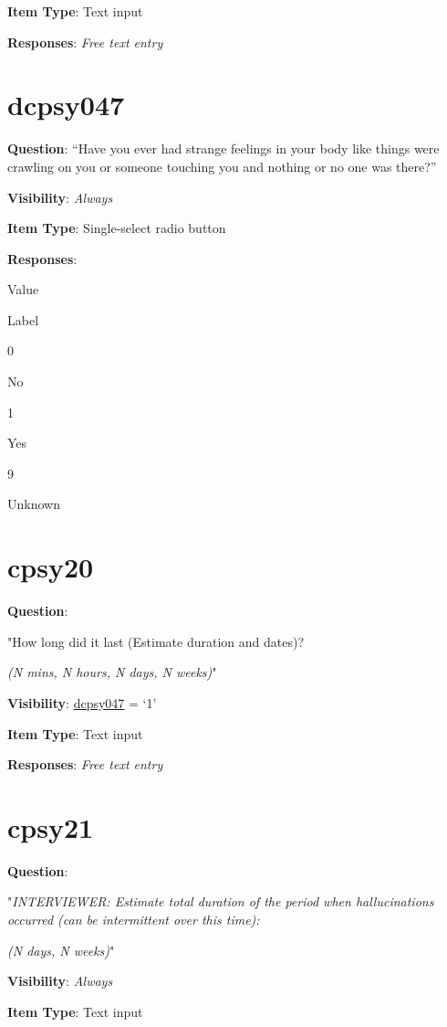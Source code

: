 \documentclass[]{book}
\begin{document}
\textbf{Item Type}: Text input

\textbf{Responses}: \emph{Free text entry}

\hypertarget{dcpsy047}{%
\section{dcpsy047}\label{dcpsy047}}

\textbf{Question}: ``Have you ever had strange feelings in your body like things were crawling on you or someone touching you and nothing or no one was there?''

\textbf{Visibility}: \emph{Always}

\textbf{Item Type}: Single-select radio button

\textbf{Responses}:

Value

Label

0

No

1

Yes

9

Unknown

\hypertarget{cpsy20}{%
\section{cpsy20}\label{cpsy20}}

\textbf{Question}:

"How long did it last (Estimate duration and dates)?

\emph{(N mins, N hours, N days, N weeks)}"

\textbf{Visibility}: \protect\hyperlink{dcpsy047}{dcpsy047} = `1'

\textbf{Item Type}: Text input

\textbf{Responses}: \emph{Free text entry}

\hypertarget{cpsy21}{%
\section{cpsy21}\label{cpsy21}}

\textbf{Question}:

"\emph{INTERVIEWER: Estimate total duration of the period when hallucinations occurred (can be intermittent over this time): }

\emph{(N days, N weeks)}"

\textbf{Visibility}: \emph{Always}

\textbf{Item Type}: Text input
\end{document}
